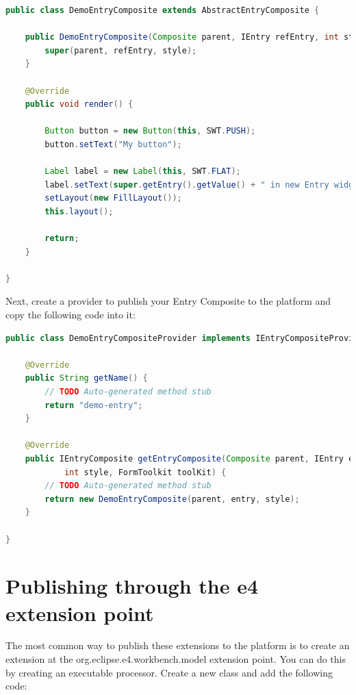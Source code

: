 \begin{lstlisting}[language=java]
public class DemoEntryComposite extends AbstractEntryComposite {

    public DemoEntryComposite(Composite parent, IEntry refEntry, int style) {
        super(parent, refEntry, style);
    }

    @Override
    public void render() {

        Button button = new Button(this, SWT.PUSH);
        button.setText("My button");

        Label label = new Label(this, SWT.FLAT);
        label.setText(super.getEntry().getValue() + " in new Entry widget.");
        setLayout(new FillLayout());
        this.layout();

        return;
    }

}
\end{lstlisting}

Next, create a provider to publish your Entry Composite to the platform and
copy the following code into it:

\begin{lstlisting}[language=java]
public class DemoEntryCompositeProvider implements IEntryCompositeProvider {

    @Override
    public String getName() {
        // TODO Auto-generated method stub
        return "demo-entry";
    }

    @Override
    public IEntryComposite getEntryComposite(Composite parent, IEntry entry,
            int style, FormToolkit toolKit) {
        // TODO Auto-generated method stub
        return new DemoEntryComposite(parent, entry, style);
    }

}
\end{lstlisting}

\section{Publishing through the e4 extension point}

The most common way to publish these extensions to the platform is to create an
extension at the org.eclipse.e4.workbench.model extension point. You can do this
by creating an executable processor. Create a new class and add the following
code:

